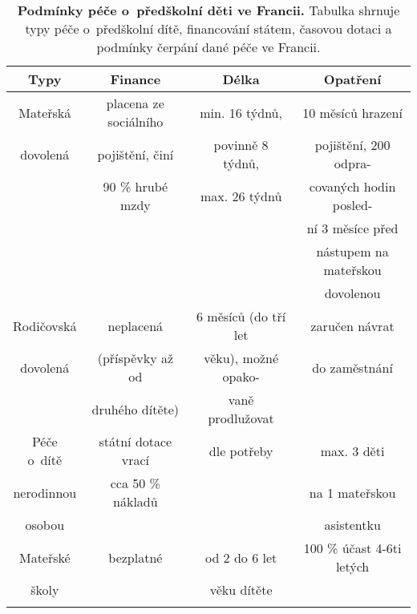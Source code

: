 		\begin{spacing}{1.0}
		\begin{table}[ht]
			\center
			\small
			\begin{center}
			\begin{tabular}{|c|c|c|c|}
				\hline
				\rowcolor{grey}		
				\textbf{Typy}	&	\textbf{Finance} & 	\textbf{Délka} 	&	\textbf{Opatření} 	\\
				\hline
				\hline
				\rowcolor{grey!10}
				Mateřská	&  placena ze sociálního &  min. 16 týdnů, 	 & 10 měsíců hrazení 		\\ \rowcolor{grey!10}
				dovolená 	& 	 pojištění, činí  	 & 	povinně 8 týdnů, & pojištění, 200 odpra- 	\\ \rowcolor{grey!10}
				 			& 	90 \% hrubé mzdy 	 &  max. 26 týdnů 	 & covaných hodin posled- 	\\ \rowcolor{grey!10}
				 			&						 & 					 & ní 3 měsíce před 		\\ \rowcolor{grey!10}
				 			&						 &					 & nástupem na mateřskou 	\\ \rowcolor{grey!10}
				 			&						 & 					 & dovolenou 				\\ \rowcolor{grey!10}
				\hline
				Rodičovská	& neplacená & 6 měsíců (do tří let 		& 	zaručen návrat 	\\ \rowcolor{grey!10}
				dovolená & (příspěvky až od & věku), možné opako-  	&  do zaměstnání	\\ \rowcolor{grey!10}
						 & druhého dítěte)  & vaně prodlužovat						&	\\ \rowcolor{grey!10}
				 \hline
				Péče o~dítě	&	státní dotace vrací	&	dle potřeby	& max. 3 děti \\ \rowcolor{grey!10}
				nerodinnou 	&	cca 50 \% nákladů 	&	& na 1 mateřskou 	\\ \rowcolor{grey!10}
				osobou 		& 						&	& asistentku		\\ \rowcolor{grey!10}
				\hline
				Mateřské 	&	bezplatné	& od 2 do 6 let	& 100 \% účast 4-6ti letých \\ \rowcolor{grey!10}
				školy 		& 	 			& věku dítěte	& 						\\ \rowcolor{grey!10}
				\hline
			\end{tabular}
			\end{center}
			\label{tab:peceFR}
			\caption{
				\textbf{Podmínky péče o~předškolní děti ve Francii.}
				Tabulka shrnuje typy péče o~předškolní dítě, financování státem, časovou dotaci a podmínky čerpání dané péče ve Francii.
							}
		\end{table}
		\end{spacing}

